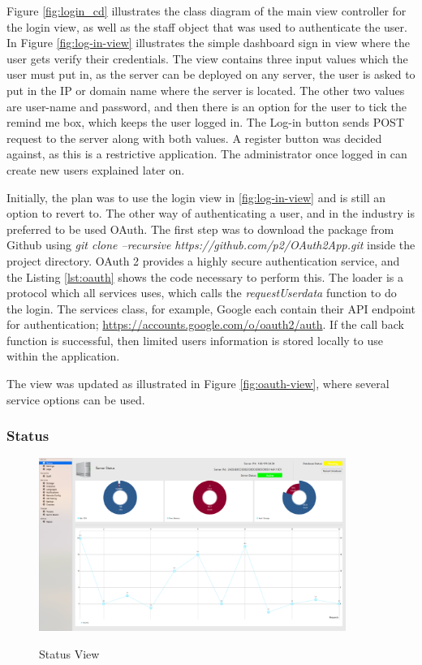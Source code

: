 Figure \ref{fig:login_cd} illustrates the class diagram of the main view controller for the login view, as well as the staff object that was used to authenticate the user. In Figure \ref{fig:log-in-view} illustrates the simple dashboard sign in view where the user gets verify their credentials. The view contains three input values which the user must put in, as the server can be deployed on any server, the user is asked to put in the IP or domain name where the server is located. The other two values are user-name and password, and then there is an option for the user to tick the remind me box, which keeps the user logged in. The Log-in button sends POST request to the server along with both values. A register button was decided against, as this is a restrictive application. The administrator once logged in can create new users explained later on.

Initially, the plan was to use the login view in \ref{fig:log-in-view} and is still an option to revert to. The other way of authenticating a user, and in the industry is preferred to be used OAuth. The first step was to download the package from Github using \textit{git clone --recursive https://github.com/p2/OAuth2App.git} inside the project directory. OAuth 2 provides a highly secure authentication service, and the Listing \ref{lst:oauth} shows the code necessary to perform this. The loader is a protocol which all services uses, which calls the \textit{requestUserdata} function to do the login. The services class, for example, Google each contain their API endpoint for authentication;  \url{https://accounts.google.com/o/oauth2/auth}. If the call back function is successful, then limited users information is stored locally to use within the application.

The view was updated as illustrated in Figure \ref{fig:oauth-view}, where several service options can be used.



\subsubsection{Status}

\begin{figure}[!h]
    \caption{Status View}
    \centering
    \includegraphics[width=100mm]{images/dashboard/status_view}
    \label{fig:status-view}
\end{figure}

